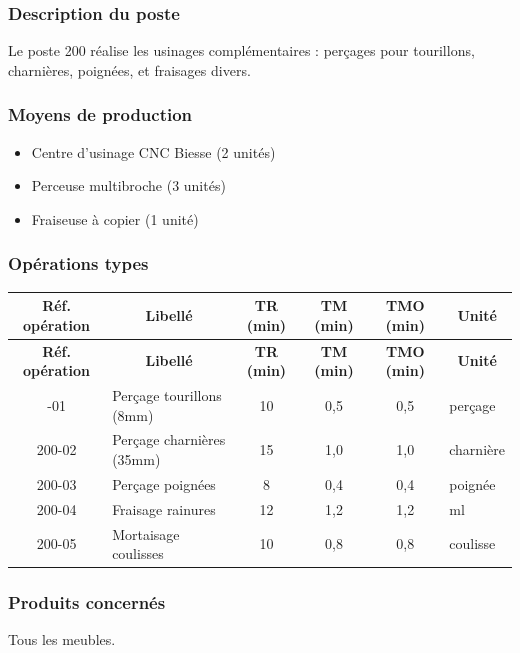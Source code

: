 \documentclass[12pt,a4paper]{article}
\begin{document}
\subsubsection{Description du poste}
Le poste 200 réalise les usinages complémentaires : perçages pour tourillons, charnières, poignées, et fraisages divers.

\subsubsection{Moyens de production}
\begin{itemize}
    \item Centre d'usinage CNC Biesse (2 unités)
    \item Perceuse multibroche (3 unités)
    \item Fraiseuse à copier (1 unité)
\end{itemize}

\subsubsection{Opérations types}

\begin{longtable}{|c|p{5cm}|c|c|c|p{3cm}|}
\hline
\multicolumn{1}{|c|}{\textbf{Réf. opération}} & \multicolumn{1}{c|}{\textbf{Libellé}} & \multicolumn{1}{c|}{\textbf{TR (min)}} & \multicolumn{1}{c|}{\textbf{TM (min)}} & \multicolumn{1}{c|}{\textbf{TMO (min)}} & \multicolumn{1}{c|}{\textbf{Unité}} \\
\hline
\endfirsthead
\hline
\multicolumn{1}{|c|}{\textbf{Réf. opération}} & \multicolumn{1}{c|}{\textbf{Libellé}} & \multicolumn{1}{c|}{\textbf{TR (min)}} & \multicolumn{1}{c|}{\textbf{TM (min)}} & \multicolumn{1}{c|}{\textbf{TMO (min)}} & \multicolumn{1}{c|}{\textbf{Unité}} \\
\hline
\endhead
\hline
\endfoot
200-01 & Perçage tourillons (8mm) & 10 & 0,5 & 0,5 & perçage \\
200-02 & Perçage charnières (35mm) & 15 & 1,0 & 1,0 & charnière \\
200-03 & Perçage poignées & 8 & 0,4 & 0,4 & poignée \\
200-04 & Fraisage rainures & 12 & 1,2 & 1,2 & ml \\
200-05 & Mortaisage coulisses & 10 & 0,8 & 0,8 & coulisse \\
\hline
\end{longtable}

\subsubsection{Produits concernés}
Tous les meubles.
\end{document}
